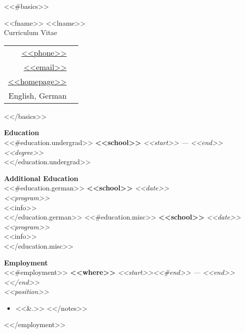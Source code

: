 \documentclass[11pt,a4paper,sans]{article}
\newcommand{\cvcolor}[1]{{\color{MidnightBlue}#1}}
\renewcommand{\section}[1]{
  \cvcolor{\noindent \textbf{\LARGE #1}}
  \vspace{.5em}\\
}
\renewcommand{\subsection}[1]{
  \cvcolor{\noindent \textbf{\Large #1} \dotfill}
  \vspace{.5em}\\
}
\begin{document}
<<#basics>>
\noindent
\begin{minipage}{0.6\linewidth}
 {
 \fontsize{40pt}{50pt}\selectfont
 \noindent
 {<<fname>> <<lname>>}}\\
{\LARGE \color{darkgray} {Curriculum Vitae}}
\end{minipage}
\hfill
\begin{tabular}{|rl}
  \href{tel:<<phone>>}{<<phone>>}&\cvcolor{\faPhone} \\
  \href{mailto:<<email>>}{<<email>>}&\cvcolor{\faEnvelope} \\
  \href{<<homepage>>}{<<homepage>>}&\cvcolor{\faGlobe} \\
  English, German & \cvcolor{\faLanguage} \\
\end{tabular}
<</basics>>

\vspace{1em}

\section{Education}
<<#education.undergrad>>
\textbf{<<school>>} \hfill \textsl{<<start>> --- <<end>>}\\
\textsl{<<degree>>}\\
<</education.undergrad>>

\subsection{Additional Education}
<<#education.german>>
\textbf{<<school>>} \hfill \textsl{<<date>>}\\
\textsl{<<program>>}\\
<<info>>\\
<</education.german>>
<<#education.misc>>
\textbf{<<school>>} \hfill \textsl{<<date>>}\\
\textsl{<<program>>}\\
<<info>>\\
<</education.misc>>

\section{Employment}
<<#employment>>
\textbf{<<where>>} \hfill \textsl{<<start>><<#end>> --- <<end>><</end>>}\\
\textsl{<<position>>}
\nopagebreak
\begin{itemize}
  <<#notes>>
  \item <<&.>>
  <</notes>>
\end{itemize}
\vspace{1em}
<</employment>>
\end{document}
